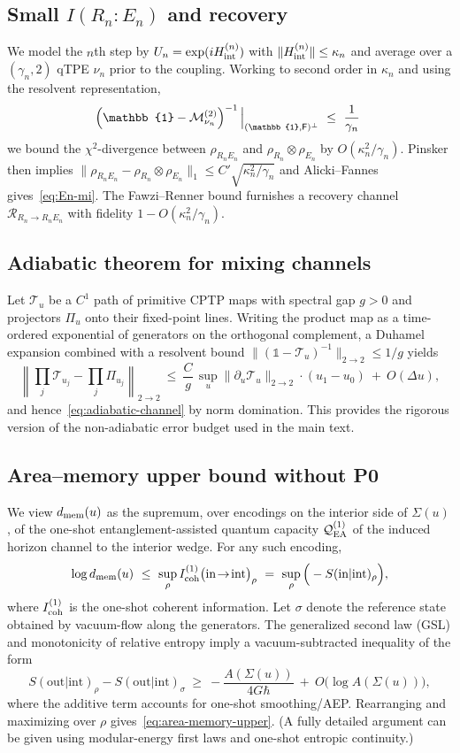\subsection{Small $I(R_n{:}E_n)$ and recovery}\label{app:En-recovery}
We model the $n$th step by $U_n=\exp(iH_{\rm int}^{(n)})$ with $\|H_{\rm int}^{(n)}\|\le \kappa_n$ and average over a $(\gamma_n,2)$ qTPE $\nu_n$ prior to the coupling. Working to second order in $\kappa_n$ and using the resolvent representation,
\[
\left(\mathbb{1}-\Mtwo_{\nu_n}\right)^{-1}\Big|_{(\mathbb{1},\mathsf{F})^\perp}\ \le\ \frac{1}{\gamma_n}\,\,
\]
we bound the $\chi^2$-divergence between $\rho_{R_nE_n}$ and $\rho_{R_n}\otimes\rho_{E_n}$ by $O(\kappa_n^2/\gamma_n)$. Pinsker then implies $\|\rho_{R_nE_n}-\rho_{R_n}\otimes\rho_{E_n}\|_1\le C' \sqrt{\kappa_n^2/\gamma_n}$ and Alicki--Fannes gives~\eqref{eq:En-mi}. The Fawzi--Renner bound furnishes a recovery channel $\mathcal{R}_{R_n\to R_n E_n}$ with fidelity $1-O(\kappa_n^2/\gamma_n)$.

\subsection{Adiabatic theorem for mixing channels}\label{app:adiabatic-channels}
Let $\mathcal{T}_u$ be a $C^1$ path of primitive CPTP maps with spectral gap $g>0$ and projectors $\Pi_u$ onto their fixed-point lines. Writing the product map as a time-ordered exponential of generators on the orthogonal complement, a Duhamel expansion combined with a resolvent bound $\|(\mathbb{1}-\mathcal{T}_u)^{-1}\|_{2\to 2}\le 1/g$ yields
\[
\left\|\prod_j\mathcal{T}_{u_j}-\prod_j\Pi_{u_j}\right\|_{2\to 2}\ \le\ \frac{C}{g}\,\sup_u\|\partial_u\mathcal{T}_u\|_{2\to 2}\cdot (u_1-u_0)\ +\ O(\Delta u),
\]
and hence~\eqref{eq:adiabatic-channel} by norm domination. This provides the rigorous version of the non-adiabatic error budget used in the main text.

\subsection{Area--memory upper bound without P0}\label{app:area-memory}
We view $d_{\rm mem}(u)$ as the supremum, over encodings on the interior side of $\Sigma(u)$, of the one-shot entanglement-assisted quantum capacity $\mathcal{Q}^{(1)}_{\rm EA}$ of the induced horizon channel to the interior wedge. For any such encoding,
\[
\log d_{\rm mem}(u)\ \le\ \sup_\rho I_{\rm coh}^{(1)}\big(\text{in}\!\rightarrow\!\text{int}\big)_\rho\ =\ \sup_\rho \Big(-S(\text{in}|\text{int})_\rho\Big),
\]
where $I_{\rm coh}^{(1)}$ is the one-shot coherent information. Let $\sigma$ denote the reference state obtained by vacuum-flow along the generators. The generalized second law (GSL) and monotonicity of relative entropy imply a vacuum-subtracted inequality of the form
\[
S(\text{out}|\text{int})_\rho - S(\text{out}|\text{int})_\sigma\ \ge\ -\frac{A(\Sigma(u))}{4G\hbar}\ +\ O\!\big(\log A(\Sigma(u))\big)\!,
\]
where the additive term accounts for one-shot smoothing/AEP. Rearranging and maximizing over $\rho$ gives~\eqref{eq:area-memory-upper}. (A fully detailed argument can be given using modular-energy first laws and one-shot entropic continuity.)

